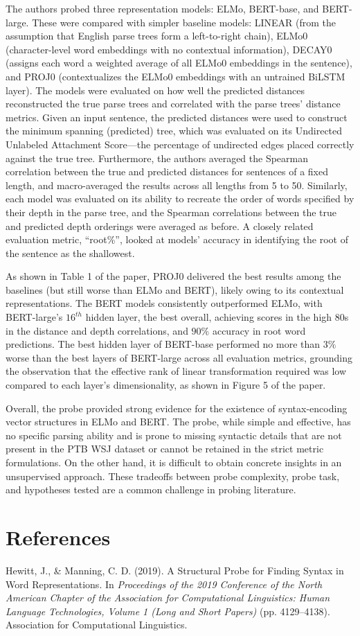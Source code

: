 \documentclass[11pt]{article}
\begin{document}
The authors probed three representation models: 
ELMo, BERT-base, and BERT-large. 
These were compared with simpler baseline 
models: LINEAR (from the assumption
that English parse trees form a left-to-right
chain), ELMo0 (character-level word embeddings with no contextual information), 
DECAY0 (assigns each word a weighted average
of all ELMo0 embeddings in the sentence), 
and PROJ0 (contextualizes the ELMo0 embeddings
with an untrained BiLSTM layer).
The models were evaluated on how well the predicted
distances reconstructed the true parse trees 
and correlated with the parse trees’
distance metrics. Given an input sentence, the predicted distances
were used to construct the minimum spanning (predicted) tree, 
which was evaluated on its Undirected Unlabeled Attachment Score---the percentage of undirected edges placed correctly
against the true tree. Furthermore, the authors
averaged the Spearman correlation between 
the true and predicted distances for 
sentences of a fixed length,
and macro-averaged the results
across all lengths from 5 to 50.
Similarly, each model was evaluated
on its ability to recreate the order of words 
specified by their depth in the parse tree,
and the Spearman correlations between
the true and predicted depth orderings
were averaged as before. 
A closely related evaluation metric, ``root\%'',
looked at models’ accuracy in identifying the 
root of the sentence as the shallowest.


As shown in Table 1 of the paper, 
PROJ0 delivered the best results among the baselines (but still worse than ELMo and BERT),
likely owing to its contextual representations.
The BERT models consistently outperformed ELMo, 
with BERT-large's $16^{th}$ hidden layer,
the best overall, achieving scores in the 
high $80$s in the distance and depth correlations, 
and $90\%$ accuracy in root word predictions.
The best hidden layer of BERT-base
performed no more than $3\%$ worse than the best layers of BERT-large
across all evaluation metrics, grounding the observation that the 
effective rank of linear transformation required 
was low compared to each layer's dimensionality, as shown in Figure 5 of the paper.

Overall, the probe provided strong evidence for the existence of
syntax-encoding vector structures in ELMo and BERT. The probe,
while simple and effective, has no specific parsing ability and is prone 
to missing syntactic details that are not present in the PTB WSJ dataset or
cannot be retained in the strict metric formulations. On the other hand, it 
is difficult to obtain concrete insights in an unsupervised approach.
These tradeoffs between probe complexity, probe task, and hypotheses tested
are a common challenge in probing literature.


\section*{References}
Hewitt, J., \& Manning, C. D. (2019). A Structural Probe for Finding Syntax in Word Representations. In \textit{Proceedings of the 2019 Conference of the North American Chapter of the Association for Computational Linguistics: Human Language Technologies, Volume 1 (Long and Short Papers)} (pp. 4129–4138). Association for Computational Linguistics.
\end{document}
